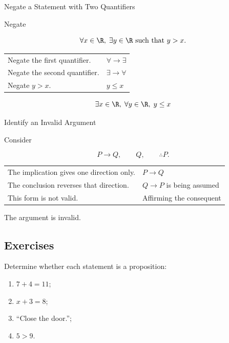 \begin{workedexamplebox}{Negate a Statement with Two Quantifiers}

Negate

\[ \forall x\in\R,\;\exists y\in\R\text{ such that }y>x. \]

\begin{tabularx}{\textwidth}{@{}>{\raggedright\arraybackslash}p{}X@{}}
Negate the first quantifier. & \(\forall\to\exists\)\\
Negate the second quantifier. & \(\exists\to\forall\)\\
Negate \(y>x\). & \(y\leq x\)
\end{tabularx}

\begin{answerbox}
\[ \exists x\in\R,\;\forall y\in\R,\;y\leq x \]
\end{answerbox}
\end{workedexamplebox}

\begin{workedexamplebox}{Identify an Invalid Argument}

Consider

\[ P\to Q,\qquad Q,\qquad \therefore P. \]

\begin{tabularx}{\textwidth}{@{}>{\raggedright\arraybackslash}p{}X@{}}
The implication gives one direction only. & \(P\to Q\)\\
The conclusion reverses that direction. & \(Q\to P\) is being assumed\\
This form is not valid. & Affirming the consequent
\end{tabularx}

\begin{answerbox}
The argument is invalid.
\end{answerbox}
\end{workedexamplebox}

\subsection{Exercises}
\label{subsec:logic-exercises}

\begin{exercise}[1]
Determine whether each statement is a proposition:
\begin{enumerate}
    \item \(7+4=11\);
    \item \(x+3=8\);
    \item ``Close the door.'';
    \item \(5>9\).
\end{enumerate}
\end{exercise}

